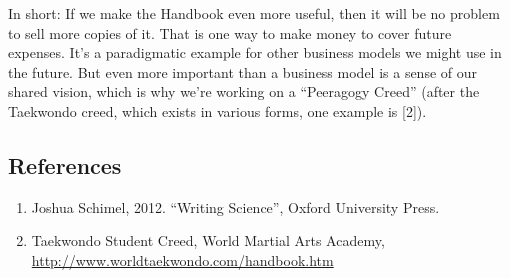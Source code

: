 In short: If we make the Handbook even more useful, then it will be no
problem to sell more copies of it. That is one way to make money to
cover future expenses. It's a paradigmatic example for other business
models we might use in the future. But even more important than
a business model is a sense of our shared vision, which is why
we're working on a ``Peeragogy Creed'' (after the Taekwondo creed, which
exists in various forms, one example is {[}2{]}).

\subsection*{References}\label{references}

\begin{enumerate}
\def\labelenumi{\arabic{enumi}.}
\item
  Joshua Schimel, 2012. ``Writing Science'', Oxford University Press.
\item
  Taekwondo Student Creed, World Martial Arts Academy, \url{http://www.worldtaekwondo.com/handbook.htm}
\end{enumerate}
